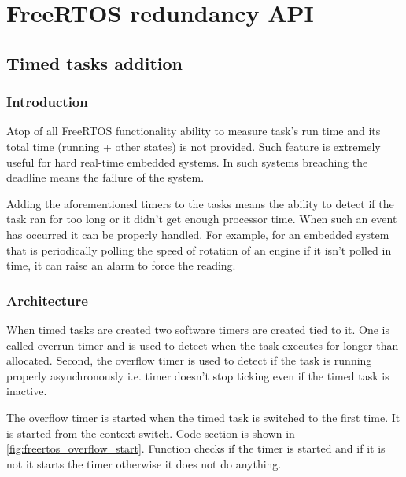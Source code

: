 \chapter{FreeRTOS redundancy API} %
\label{freertos_modification}

\section{Timed tasks addition}

\subsection{Introduction}

Atop of all FreeRTOS functionality ability to measure task's run time and its total time (running + other states) is not provided. Such feature is extremely useful for hard real-time embedded systems. In such systems breaching the deadline means the failure of the system.

Adding the aforementioned timers to the tasks means the ability to detect if the task ran for too long or it didn't get enough processor time. When such an event has occurred it can be properly handled. For example, for an embedded system that is periodically polling the speed of rotation of an engine if it isn't polled in time, it can raise an alarm to force the reading.

\subsection{Architecture}


When timed tasks are created two software timers are created tied to it. One is called overrun timer and is used to detect when the task executes for longer than allocated. Second, the overflow timer is used to detect if the task is running properly asynchronously i.e. timer doesn't stop ticking even if the timed task is inactive.  

The overflow timer is started when the timed task is switched to the first time. It is started from the context switch. Code section is shown in \autoref{fig:freertos_overflow_start}. Function  checks if the timer is started and if it is not it starts the timer otherwise it does not do anything.


